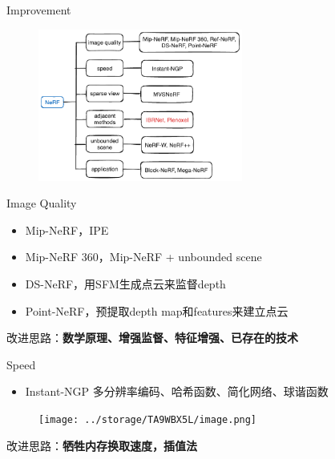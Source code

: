 \documentclass[dark]{sintefbeamer}
\begin{document}
\begin{frame}[fragile]{Improvement}
  
  \begin{figure}
    \includegraphics[width=0.6\textwidth]{images/NeRFImprovement.png}
  \end{figure}
  
\end{frame}

\begin{frame}[fragile]{Image Quality}

\begin{itemize}
  \item Mip-NeRF\cite{barronMipNeRFMultiscaleRepresentation}，IPE
  \item Mip-NeRF 360\cite{barronMipNeRF360Unbounded2022}，Mip-NeRF + unbounded scene
  \item DS-NeRF\cite{dengDepthsupervisedNeRFFewer2022}，用SFM生成点云来监督depth
  \item Point-NeRF\cite{xuPointNeRFPointbasedNeural2022}，预提取depth map和features来建立点云
\end{itemize}
  
改进思路：\textbf{数学原理、增强监督、特征增强、已存在的技术}

\end{frame}

\begin{frame}[fragile]{Speed}

  \begin{itemize}
    \item Instant-NGP\cite{mullerInstantNeuralGraphics2022} \quad 多分辨率编码、哈希函数、简化网络、球谐函数
  \end{itemize}

  \begin{figure}
    \texttt{[image: ../storage/TA9WBX5L/image.png]}
  \end{figure}
    
  改进思路：\textbf{牺牲内存换取速度，插值法}
  
  \end{frame}
\end{document}
